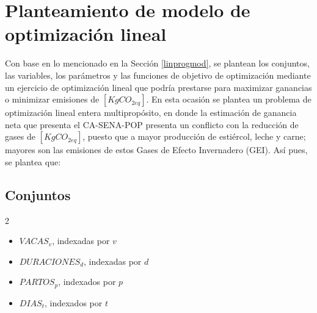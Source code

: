 


\section{Planteamiento de modelo de optimización lineal}

Con base en lo mencionado en la Sección \ref{linprogmod}, se plantean los conjuntos, las variables, los parámetros y las funciones de objetivo de optimización mediante un ejercicio de optimización lineal que podría prestarse para maximizar ganancias o minimizar emisiones de $[KgCO_{2eq}]$. En esta ocasión se plantea un problema de optimización lineal entera multipropósito, en donde la estimación de ganancia neta que presenta el CA-SENA-POP presenta un conflicto con la reducción de gases de $[KgCO_{2eq}]$, puesto que a mayor producción de estiércol, leche y carne; mayores son las emisiones de estos Gases de Efecto Invernadero (GEI). Así pues, se plantea que:

\subsection{Conjuntos}
\begin{multicols}{2}
    \begin{itemize}
        \item $VACAS_{v}$, indexadas por $v$
        \item $DURACIONES_{d}$, indexadas por $d$
        \item $PARTOS_{p}$, indexados por $p$
        \item $DIAS_{t}$, indexados por $t$
    \end{itemize}
\end{multicols}

